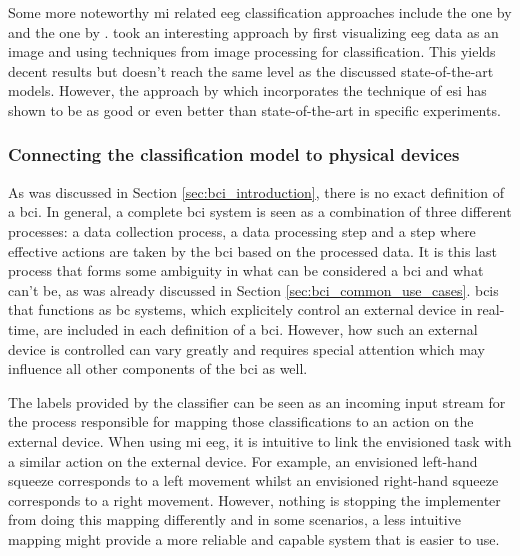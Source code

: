 
Some more noteworthy \gls{mi} related \gls{eeg} classification approaches include the one by \citet{eeg_mi_model_image_based} and the one by \citet{eeg_model_esi}.
 took an interesting approach by first visualizing \gls{eeg} data as an image and using techniques from image processing for classification.
This yields decent results but doesn't reach the same level as the discussed state-of-the-art models.
However, the approach by \citet{eeg_model_esi} which incorporates the technique of \gls{esi} has shown to be as good or even better than state-of-the-art in specific experiments.




\subsubsection{Connecting the classification model to physical devices}
\label{subsubsec:bci_opportunities_obstacles_motivating_examples_physical_devices}

As was discussed in Section \ref{sec:bci_introduction}, there is no exact definition of a \gls{bci}.
In general, a complete \gls{bci} system is seen as a combination of three different processes: a data collection process, a data processing step and a step where effective actions are taken by the \gls{bci} based on the processed data.
It is this last process that forms some ambiguity in what can be considered a \gls{bci} and what can't be, as was already discussed in Section \ref{sec:bci_common_use_cases}.
\Glspl{bci} that functions as \gls{bc} systems, which explicitely control an external device in real-time, are included in each definition of a \gls{bci}.
However, how such an external device is controlled can vary greatly and requires special attention which may influence all other components of the \gls{bci} as well. 

The labels provided by the classifier can be seen as an incoming input stream for the process responsible for mapping those classifications to an action on the external device.
When using \gls{mi} \gls{eeg}, it is intuitive to link the envisioned task with a similar action on the external device.
For example, an envisioned left-hand squeeze corresponds to a left movement whilst an envisioned right-hand squeeze corresponds to a right movement.
However, nothing is stopping the implementer from doing this mapping differently and in some scenarios, a less intuitive mapping might provide a more reliable and capable system that is easier to use.

